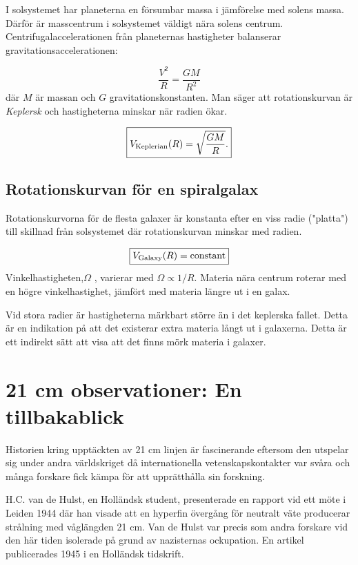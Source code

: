 I solsystemet har planeterna en försumbar massa i jämförelse med
solens massa. Därför är masscentrum i solsystemet väldigt nära solens
centrum. Centrifugalaccelerationen från planeternas hastigheter
balanserar gravitationsaccelerationen:

\begin{equation}
\frac{V^2}{R}= \frac{GM}{R^2}
\end{equation}
där $M$ är massan och $G$ gravitationskonstanten. Man säger att
rotationskurvan är \emph{Keplersk} och hastigheterna minskar när
radien ökar.

\begin{equation}
\boxed{V_{\rm Keplerian}(R) = \sqrt{\frac{GM}{R}}.}
\label{kepler}
\end{equation}



\section{Rotationskurvan för en spiralgalax}

Rotationskurvorna för de flesta galaxer är konstanta efter en viss
radie ("platta") till skillnad från solsystemet där rotationskurvan
minskar med radien.

\begin{equation}
\boxed{V_{\rm Galaxy}(R) = {\rm constant}}
\end{equation}
Vinkelhastigheten,$\Omega$ , varierar med $\Omega \propto
1/R$. Materia nära centrum roterar med en högre vinkelhastighet,
jämfört med materia längre ut i en galax.

Vid stora radier är hastigheterna märkbart större än i det keplerska
fallet. Detta är en indikation på att det existerar extra materia
långt ut i galaxerna. Detta är ett indirekt sätt att visa att det
finns mörk materia i galaxer.


\chapter{21 cm observationer: En tillbakablick}\label{app-history}

Historien kring upptäckten av 21 cm linjen är fascinerande eftersom
den utspelar sig under andra världskriget då internationella
vetenskapskontakter var svåra och många forskare fick kämpa för att
upprätthålla sin forskning.

H.C. van de Hulst, en Holländsk student, presenterade en rapport vid
ett möte i Leiden 1944 där han visade att en hyperfin övergång för
neutralt väte producerar strålning med våglängden 21 cm. Van de Hulst
var precis som andra forskare vid den här tiden isolerade på grund av
nazisternas ockupation. En artikel publicerades 1945 i en Holländsk
tidskrift.


